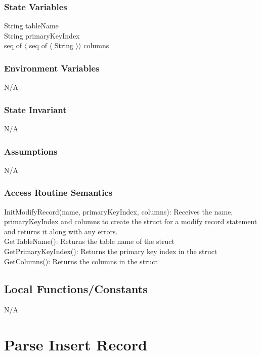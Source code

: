\documentclass[12pt]{article}
\begin{document}
\subsubsection{State Variables}
String tableName \\ 
String primaryKeyIndex \\
seq of $\langle$ seq of $\langle$ String $\rangle \rangle$ columns \\

\subsubsection{Environment Variables}
N/A

\subsubsection{State Invariant}
N/A

\subsubsection{Assumptions}
N/A

\subsubsection{Access Routine Semantics}
\noindent InitModifyRecord(name, primaryKeyIndex, columns): Receives the name, primaryKeyIndex and columns to create the struct for a modify record statement and returns it along with any errors. \\

\noindent GetTableName(): Returns the table name of the struct \\

\noindent GetPrimaryKeyIndex(): Returns the primary key index in the struct \\

\noindent GetColumns(): Returns the columns in the struct \\

\subsection{Local Functions/Constants}
N/A

\newpage

\section{Parse Insert Record}
\end{document}
